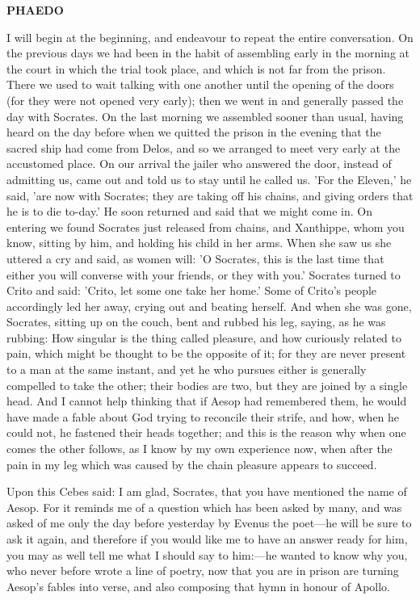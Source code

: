 \documentclass[11pt,letter]{article}
\begin{document}
\par \textbf{PHAEDO}
\par   I will begin at the beginning, and endeavour to repeat the entire conversation. On the previous days we had been in the habit of assembling early in the morning at the court in which the trial took place, and which is not far from the prison. There we used to wait talking with one another until the opening of the doors (for they were not opened very early); then we went in and generally passed the day with Socrates. On the last morning we assembled sooner than usual, having heard on the day before when we quitted the prison in the evening that the sacred ship had come from Delos, and so we arranged to meet very early at the accustomed place. On our arrival the jailer who answered the door, instead of admitting us, came out and told us to stay until he called us. 'For the Eleven,' he said, 'are now with Socrates; they are taking off his chains, and giving orders that he is to die to-day.' He soon returned and said that we might come in. On entering we found Socrates just released from chains, and Xanthippe, whom you know, sitting by him, and holding his child in her arms. When she saw us she uttered a cry and said, as women will:  'O Socrates, this is the last time that either you will converse with your friends, or they with you.' Socrates turned to Crito and said:  'Crito, let some one take her home.' Some of Crito's people accordingly led her away, crying out and beating herself. And when she was gone, Socrates, sitting up on the couch, bent and rubbed his leg, saying, as he was rubbing:  How singular is the thing called pleasure, and how curiously related to pain, which might be thought to be the opposite of it; for they are never present to a man at the same instant, and yet he who pursues either is generally compelled to take the other; their bodies are two, but they are joined by a single head. And I cannot help thinking that if Aesop had remembered them, he would have made a fable about God trying to reconcile their strife, and how, when he could not, he fastened their heads together; and this is the reason why when one comes the other follows, as I know by my own experience now, when after the pain in my leg which was caused by the chain pleasure appears to succeed.

\par  Upon this Cebes said: I am glad, Socrates, that you have mentioned the name of Aesop. For it reminds me of a question which has been asked by many, and was asked of me only the day before yesterday by Evenus the poet—he will be sure to ask it again, and therefore if you would like me to have an answer ready for him, you may as well tell me what I should say to him:—he wanted to know why you, who never before wrote a line of poetry, now that you are in prison are turning Aesop's fables into verse, and also composing that hymn in honour of Apollo.
\end{document}

